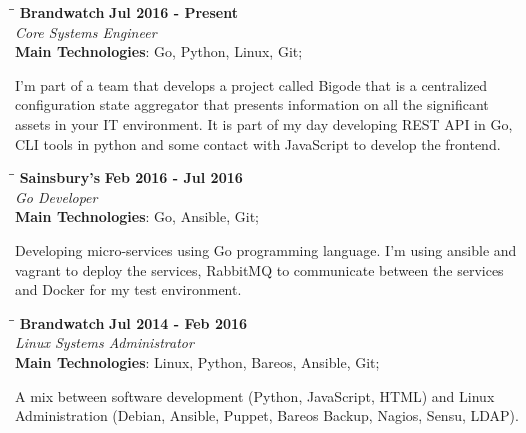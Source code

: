 \documentclass[margin]{res}
\begin{document}
\begin{resume}
\vspace{-0.1in}
   \begin{tabbing}
   \hspace{2.3in}\= \hspace{1.7in}\= \kill %
    \textbf{Brandwatch}    \>\>\textbf{Jul 2016 - Present}\\
    \textit{Core Systems Engineer}\\        
    \textbf{Main Technologies}: Go, Python, Linux, Git;
   \end{tabbing}\vspace{-20pt}      %
    \vspace{2mm}
I'm part of a team that develops a project called Bigode that is a centralized configuration state aggregator that presents information on all the significant assets in your IT environment. It is part of my day developing REST API  in Go, CLI tools in python and some contact with JavaScript to develop the frontend.

\vspace{-0.1in}
   \begin{tabbing}
   \hspace{2.3in}\= \hspace{1.7in}\= \kill %
    \textbf{Sainsbury's}    \>\>\textbf{Feb 2016 - Jul 2016}\\
    \textit{Go Developer}\\        
    \textbf{Main Technologies}: Go, Ansible, Git;
   \end{tabbing}\vspace{-20pt}      %
    \vspace{2mm}
Developing micro-services using Go programming language. I'm using ansible and vagrant to deploy the services, RabbitMQ to communicate between the services and Docker for my test environment.

\vspace{-0.1in}
   \begin{tabbing}
   \hspace{2.3in}\= \hspace{1.7in}\= \kill %
    \textbf{Brandwatch}    \>\>\textbf{Jul 2014 - Feb 2016}\\
    \textit{Linux Systems Administrator}\\        
    \textbf{Main Technologies}: Linux, Python, Bareos, Ansible, Git;
   \end{tabbing}\vspace{-20pt}      %
    \vspace{2mm}
A mix between software development (Python, JavaScript, HTML) and Linux Administration (Debian, Ansible, Puppet, Bareos Backup, Nagios, Sensu, LDAP).


\end{resume}
\end{document}
